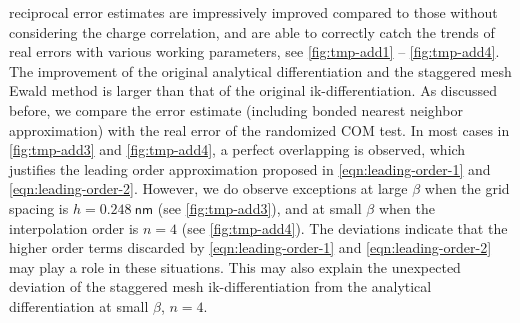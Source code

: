 \documentclass[journal=jacsat,manuscript=article]{achemso}
\begin{document}
{reciprocal error estimates are impressively improved compared
to those without considering the charge correlation,
and are able to correctly
catch the trends of real errors with various working parameters,
see \ref{fig:tmp-add1} -- \ref{fig:tmp-add4}.
The improvement of
the original analytical differentiation and the staggered mesh
Ewald method is larger than that of the original ik-differentiation.
As discussed before, we compare the error estimate (including
bonded nearest neighbor approximation)
with the real error of the randomized COM test.
In most cases in \ref{fig:tmp-add3} and \ref{fig:tmp-add4},
a perfect overlapping is observed, which justifies the
leading order approximation proposed in
\ref{eqn:leading-order-1} and \ref{eqn:leading-order-2}.
However,
we do observe exceptions
at large $\beta$ when the grid spacing is $h=0.248\:\textsf{nm}$
(see \ref{fig:tmp-add3}), and
at small $\beta$ when the interpolation order is $n=4$
(see \ref{fig:tmp-add4}).
The deviations indicate that the 
higher order terms discarded by
\ref{eqn:leading-order-1} and \ref{eqn:leading-order-2}
may play a role
in these situations.
This may also
explain the unexpected deviation of the  staggered mesh
ik-differentiation from the analytical differentiation
at  small $\beta$, $n=4$.





}
\end{document}
